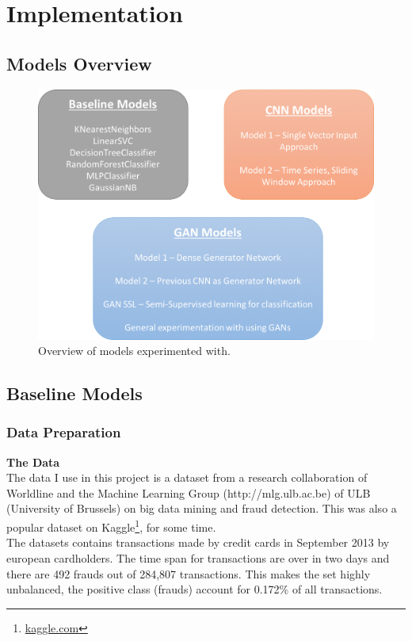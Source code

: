 \documentclass[12pt,a4paper,twoside]{report}
\begin{document}
\chapter{Implementation}
\section{Models Overview}

\begin{figure}[H]
\centering
\includegraphics[scale=0.8]{models_overview_2}
\caption{Overview of models experimented with.}
\label{fig:models_overview}
\end{figure}

\section{Baseline Models}
\subsection{Data Preparation}

\textbf{The Data}\\

The data I use in this project is a dataset from a research collaboration of Worldline and the Machine Learning Group (http://mlg.ulb.ac.be) of ULB (University of Brussels) on big data mining and fraud detection. This was also a popular dataset on Kaggle\footnote{\href{kaggle.com}{kaggle.com}}, for some time.\\
The datasets contains transactions made by credit cards in September 2013 by european cardholders. The time span for transactions are over in two days and there are 492 frauds out of 284,807 transactions. This makes the set highly unbalanced, the positive class (frauds) account for 0.172\% of all transactions.
 
\end{document}
